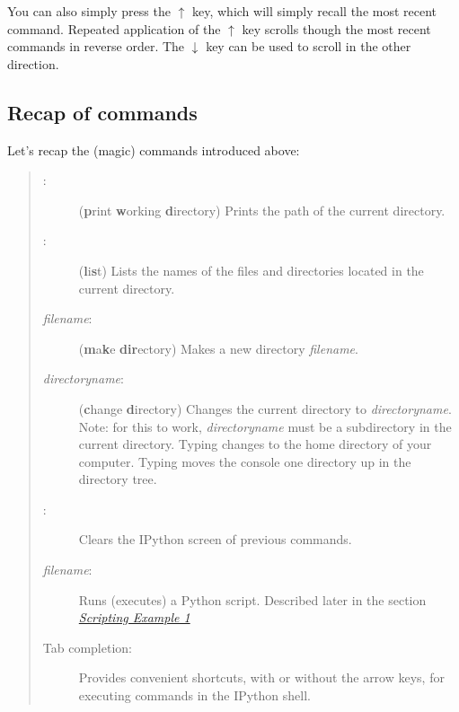 \documentclass[letterpaper,10pt,english]{sphinxmanual}
\begin{document}
You can also simply press the $\uparrow$ key, which will simply recall the most recent command.  Repeated application of the $\uparrow$ key scrolls though the most recent commands in reverse order.  The $\downarrow$ key can be used to scroll in the other direction.


\subsection{Recap of commands}
\label{chap2/chap2_basics:recap-of-commands}
Let's recap the (magic) commands introduced above:
\begin{quote}
\begin{description}
\item[{:}] \leavevmode
(\textbf{p}rint \textbf{w}orking \textbf{d}irectory) Prints the path of the current directory.

\item[{:}] \leavevmode
(\textbf{l}i\textbf{s}t)  Lists the names of the files and directories located in the current directory.

\item[{ \emph{filename}:}] \leavevmode
(\textbf{m}a\textbf{k}e \textbf{dir}ectory)  Makes a new directory \emph{filename}.

\item[{ \emph{directoryname}:}] \leavevmode
(\textbf{c}hange \textbf{d}irectory)  Changes the current directory to \emph{directoryname}.  Note: for this to work, \emph{directoryname} must be a subdirectory in the current directory.  Typing  changes to the home directory of your computer.  Typing  moves the console one directory up in the directory tree.

\item[{:}] \leavevmode
Clears the IPython screen of previous commands.

\item[{ \emph{filename}:}] \leavevmode
Runs (executes) a Python script.  Described later in the section {\hyperref[chap2/chap2_basics:chap2-scriptexmp1]{\emph{Scripting Example 1}}}

\item[{Tab completion:}] \leavevmode
Provides convenient shortcuts, with or without the arrow keys, for executing commands in the IPython shell.

\end{description}
\end{quote}
\end{document}

